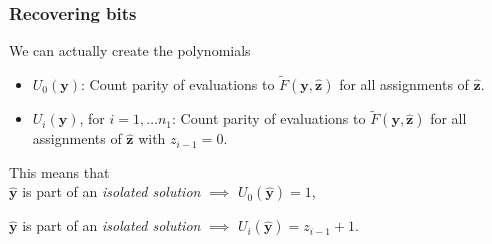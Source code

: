 \documentclass{beamer}
\begin{document}
\begin{frame}
    \frametitle{Recovering bits}
        We can actually create the polynomials
        \begin{itemize}
            \item[] $U_0(\mathbf{y})$: Count parity of evaluations to $\tilde{F}(\mathbf{y}, \hat{\mathbf{z}})$ for all assignments of $\hat{\mathbf{z}}$.
            \vspace{0.5cm}
            \item[] $U_i(\mathbf{y})$, for $i = 1, \dots n_1$: Count parity of evaluations to $\tilde{F}(\mathbf{y}, \hat{\mathbf{z}})$ for all assignments of $\hat{\mathbf{z}}$ with $z_{i - 1} = 0$.
        \end{itemize}

        \pause

        This means that\\
        $\hat{\mathbf{y}}$ is part of an \textit{isolated solution} $\implies$ $U_0(\hat{\mathbf{y}}) = 1$,

        \pause 

        $\hat{\mathbf{y}}$ is part of an \textit{isolated solution} $\implies$ $U_i(\hat{\mathbf{y}}) = z_{i - 1} + 1$.
\end{frame}
\end{document}
